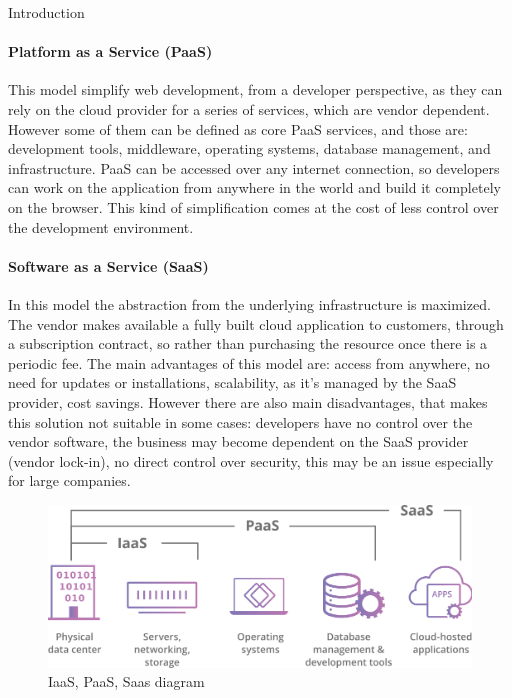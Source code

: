 \begin{chapter}{Introduction}
    \paragraph{Platform as a Service (PaaS)}
    This model simplify web development, from a developer perspective, as they can rely on
    the cloud provider for a series of services, which are vendor dependent. However some
    of them can be defined as core PaaS services, and those are: development tools,
    middleware, operating systems, database management, and infrastructure.
    PaaS can be accessed over any internet connection, so developers can work on the
    application from anywhere in the world and build it completely on the browser. This kind
    of simplification comes at the cost of less control over the development environment.

    \paragraph{Software as a Service (SaaS)}
    In this model the abstraction from the underlying infrastructure is maximized. The vendor
    makes available a fully built cloud application to customers, through a subscription
    contract, so rather than purchasing the resource once there is a periodic fee.
    The main advantages of this model are: access from anywhere, no need for updates or
    installations, scalability, as it's managed by the SaaS provider, cost savings.
    However there are also main disadvantages, that makes this solution not suitable in
    some cases: developers have no control over the vendor software, the business may become
    dependent on the SaaS provider (vendor lock-in), no direct control over security, this
    may be an issue especially for large companies.

    \begin{figure}
        \centering
        \includegraphics[width=\linewidth]{source/images/saas-paas-iaas-diagram.png}
        \caption{IaaS, PaaS, Saas diagram}
        \label{fig:cloud_computing_architectures}
    \end{figure}


\end{chapter}
